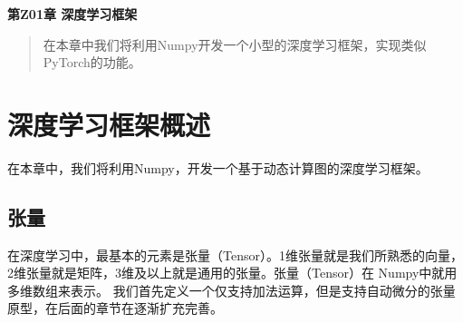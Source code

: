 \newpage
\maketitle
\begin{center}
\Large \textbf{第Z01章 深度学习框架} \quad 
\end{center}
\begin{abstract}
在本章中我们将利用Numpy开发一个小型的深度学习框架，实现类似PyTorch的功能。
\end{abstract}
\section{深度学习框架概述}
在本章中，我们将利用Numpy，开发一个基于动态计算图的深度学习框架。
\subsection{张量}
在深度学习中，最基本的元素是张量（Tensor）。1维张量就是我们所熟悉的向量，2维张量就是矩阵，3维及以上就是通用的张量。张量（Tensor）在
Numpy中就用多维数组来表示。
我们首先定义一个仅支持加法运算，但是支持自动微分的张量原型，在后面的章节在逐渐扩充完善。

